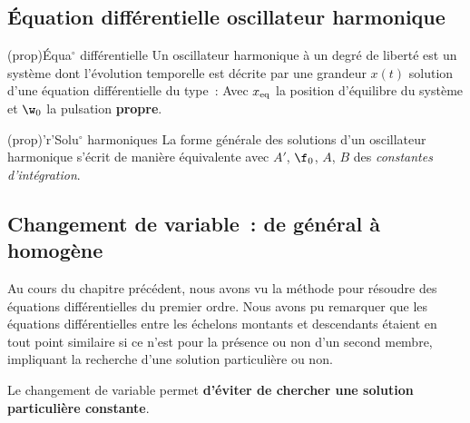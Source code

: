 \documentclass[../../main/main.tex]{subfiles}
\begin{document}
\subsection{Équation différentielle oscillateur harmonique}

\begin{tcbraster}[raster columns=2, raster equal height=rows]
	\begin{tcb}[label=prop:eqdiffoh,
			list entry={\lte\theprop~:~Équation différentielle harmonique}]
		(prop){Équa$^\circ$ différentielle}
		Un oscillateur harmonique à un degré de liberté est un système dont
		l'évolution temporelle est décrite par une grandeur $x(t)$ solution
		d'une équation différentielle du type~:
		\psw{%
		\[
			\boxed{ \dv[2]{x}{t} + \w_0{}^2x = \w_0{}^2x_{\rm eq}}
		\]
		}%
		Avec $x_{\rm eq}$ la position d'équilibre du système et $\w_0$ la
		pulsation \textbf{propre}.
	\end{tcb}
	\begin{tcb}[label=prop:soluoh,
			list entry={\lte\theprop~:~Solutions harmoniques}]
		(prop)'r'{Solu$^\circ$ harmoniques}
		La forme générale des solutions d'un oscillateur harmonique s'écrit de
		manière équivalente
		avec $A'$, $\f_0$, $A$, $B$ des \textit{constantes d'intégration}.
	\end{tcb}
\end{tcbraster}

\subsection{Changement de variable~: de général à homogène}
Au cours du chapitre précédent, nous avons vu la méthode pour résoudre des
équations différentielles du premier ordre. Nous avons pu remarquer que les
équations différentielles entre les échelons montants et descendants étaient en
tout point similaire si ce n'est pour la présence ou non d'un second membre,
impliquant la recherche d'une solution particulière ou non.

Le changement de variable permet \textbf{d'éviter de
	chercher une solution particulière constante}.
\end{document}
